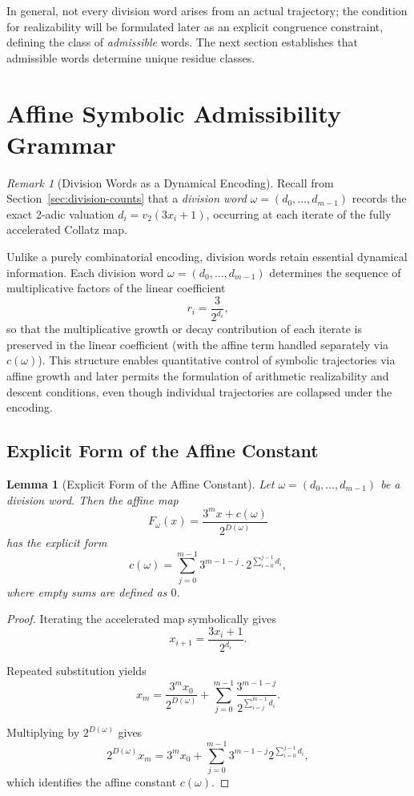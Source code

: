 \documentclass[12pt, oneside]{article}
\numberwithin{equation}{section}
\theoremstyle{definition}
\theoremstyle{plain}
\newtheorem{lemma}[theorem]{Lemma}
\theoremstyle{remark}
\newtheorem*{remark}{Remark}
\begin{document}
\noindent
In general, not every division word arises from an actual trajectory;
the condition for realizability will be formulated later as an explicit
congruence constraint, defining the class of \emph{admissible} words.  The
next section establishes that admissible words determine unique residue classes.

\section{Affine Symbolic Admissibility Grammar}
\label{sec:affine-grammar}

\begin{remark}[Division Words as a Dynamical Encoding]
Recall from Section~\ref{sec:division-counts} that a \emph{division word}
$\omega=(d_0,\dots,d_{m-1})$ records the exact 2-adic valuation
$d_i = v_2(3 x_i + 1)$, occurring at each iterate of the fully accelerated
Collatz map.

Unlike a purely combinatorial encoding, division words retain essential
dynamical information. Each division word $\omega=(d_0,\dots,d_{m-1})$
determines the sequence of multiplicative factors of the linear coefficient
\[
r_i = \frac{3}{2^{d_i}},
\]
so that the multiplicative growth or decay contribution of each iterate is
preserved in the linear coefficient (with the affine term handled separately
via $c(\omega)$). This structure enables quantitative control of symbolic
trajectories via affine growth and later permits the formulation of
arithmetic realizability and descent conditions, even though individual
trajectories are collapsed under the encoding.
\end{remark}

\subsection{Explicit Form of the Affine Constant}
\begin{lemma}[Explicit Form of the Affine Constant]
Let $\omega = (d_0,\dots,d_{m-1})$ be a division word. Then the affine map
\[
F_\omega(x) = \frac{3^m x + c(\omega)}{2^{D(\omega)}}
\]
has the explicit form
\[
c(\omega)
=
\sum_{j=0}^{m-1}
3^{m-1-j}\cdot 2^{\sum_{i=0}^{j-1} d_i},
\]
where empty sums are defined as $0$.
\end{lemma}

\begin{proof}
Iterating the accelerated map symbolically gives
\[
x_{i+1}=\frac{3x_i+1}{2^{d_i}}.
\]

Repeated substitution yields
\[
x_m
=
\frac{3^m x_0}{2^{D(\omega)}}
+
\sum_{j=0}^{m-1}
\frac{
3^{m-1-j}
}{
2^{\sum_{i=j}^{m-1} d_i}
}.
\]

Multiplying by \(2^{D(\omega)}\) gives
\[
2^{D(\omega)}x_m
=
3^m x_0
+
\sum_{j=0}^{m-1}
3^{m-1-j}
2^{\sum_{i=0}^{j-1} d_i},
\]
which identifies the affine constant \(c(\omega)\).
\end{proof}
\end{document}
